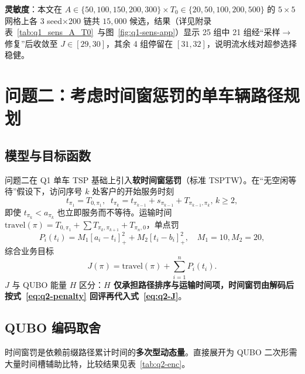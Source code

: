 \documentclass[UTF8,12pt,a4paper]{ctexart}
\begin{document}
\textbf{灵敏度}：本文在 $A\!\in\!\{50,100,150,200,300\}\!\times\!T_{0}\!\in\!\{20,50,100,200,500\}$ 的 $5\!\times\!5$ 网格上各 3 seed$\times$200 链共 $15{,}000$ 候选，结果（详见附录表~\ref{tab:q1_sens_A_T0}~与图~\ref{fig:q1-sens-app}）显示 25 组中 21 组经``采样$\to$修复''后收敛至 $J\!\in\![29,30]$，其余 4 组停留在 $[31,32]$，说明流水线对超参选择稳健。

\section{问题二：考虑时间窗惩罚的单车辆路径规划}
\label{sec:q2}

\subsection{模型与目标函数}
\label{subsec:q2-time}

问题二在 Q1 单车 TSP 基础上引入\textbf{软时间窗惩罚}（标准 TSPTW\cite{solomon1987vrptw}）。在``无空闲等待''假设下，访问序号 $k$ 处客户的开始服务时刻
\begin{equation}
t_{\pi_1}=T_{0,\pi_1},\;\;
t_{\pi_k}=t_{\pi_{k-1}}+s_{\pi_{k-1}}+T_{\pi_{k-1},\pi_k},\,k\!\ge\!2,
\label{eq:q2-t-rec}
\end{equation}
即使 $t_{\pi_k}<a_{\pi_k}$ 也立即服务而不等待。运输时间 $\mathrm{travel}(\pi)=T_{0,\pi_1}+\sum T_{\pi_k,\pi_{k+1}}+T_{\pi_n,0}$，单点罚
\begin{equation}
\label{eq:q2-penalty}
P_i(t_i)=M_1[a_i\!-\!t_i]_{+}^{2}+M_2[t_i\!-\!b_i]_{+}^{2},\quad M_1=10,M_2=20,
\end{equation}
综合业务目标
\begin{equation}
\label{eq:q2-J}
J(\pi) = \mathrm{travel}(\pi) + \sum_{i=1}^{n} P_i(t_i).
\end{equation}
$J$ 与 QUBO 能量 $H$ 区分：\textbf{$H$ 仅承担路径排序与运输时间项，时间窗罚由解码后按式~\eqref{eq:q2-penalty} 回评再代入式~\eqref{eq:q2-J}}。

\subsection{QUBO 编码取舍}
\label{subsec:q2-enc}

时间窗罚是依赖前缀路径累计时间的\textbf{多次型动态量}。直接展开为 QUBO 二次形需大量时间槽辅助比特，比较结果见表~\ref{tab:q2-enc}。
\end{document}
